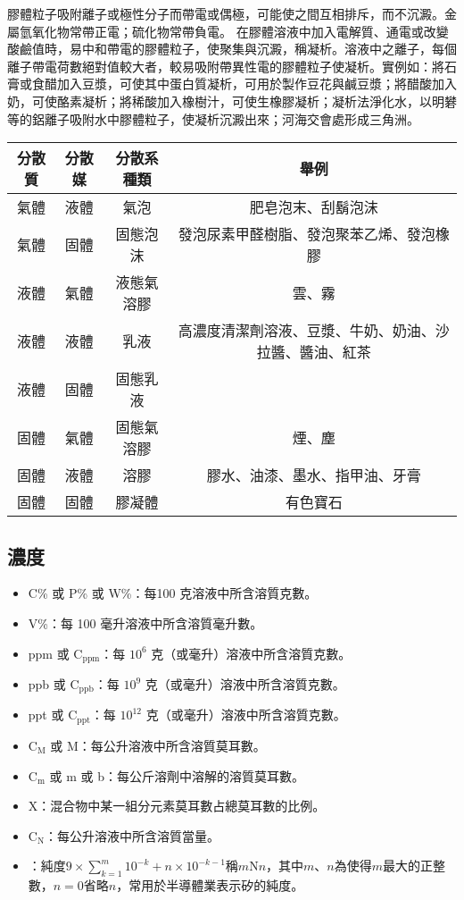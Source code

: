 \documentclass[a4paper,12pt]{article}
\begin{document}
膠體粒子吸附離子或極性分子而帶電或偶極，可能使之間互相排斥，而不沉澱。金屬氫氧化物常帶正電；硫化物常帶負電。
在膠體溶液中加入電解質、通電或改變酸鹼值時，易中和帶電的膠體粒子，使聚集與沉澱，稱凝析。溶液中之離子，每個離子帶電荷數絕對值較大者，較易吸附帶異性電的膠體粒子使凝析。實例如：將石膏或食醋加入豆漿，可使其中蛋白質凝析，可用於製作豆花與鹹豆漿；將醋酸加入奶，可使酪素凝析；將稀酸加入橡樹汁，可使生橡膠凝析；凝析法淨化水，以明礬等的鋁離子吸附水中膠體粒子，使凝析沉澱出來；河海交會處形成三角洲。
\begin{longtable}[c]{|c|c|c|c|}
\hline
分散質 & 分散媒 & 分散系種類 & 舉例 \\\hline\endhead
氣體 & 液體 & 氣泡 & 肥皂泡末、刮鬍泡沫 \\\hline
氣體 & 固體 & 固態泡沫 & 發泡尿素甲醛樹脂、發泡聚苯乙烯、發泡橡膠 \\\hline
液體 & 氣體 & 液態氣溶膠 & 雲、霧 \\\hline
液體 & 液體 & 乳液 & 高濃度清潔劑溶液、豆漿、牛奶、奶油、沙拉醬、醬油、紅茶 \\\hline
液體 & 固體 & 固態乳液 & \\\hline
固體 & 氣體 & 固態氣溶膠 & 煙、塵 \\\hline
固體 & 液體 & 溶膠 & 膠水、油漆、墨水、指甲油、牙膏 \\\hline
固體 & 固體 & 膠凝體 & 有色寶石 \\\hline
\end{longtable}\FB
\subsection{濃度}
\begin{itemize}
    \item {} C\% 或 P\% 或 W\%：每100 克溶液中所含溶質克數。
    \item {} V\%：每 100 毫升溶液中所含溶質毫升數。
    \item {} ppm 或 C$_\text{ppm}$：每 $10^6$ 克（或毫升）溶液中所含溶質克數。
    \item {} ppb 或 C$_\text{ppb}$：每 $10^9$ 克（或毫升）溶液中所含溶質克數。
    \item {} ppt 或 C$_\text{ppt}$：每 $10^{12}$ 克（或毫升）溶液中所含溶質克數。
    \item {} C$_\text{M}$ 或 M：每公升溶液中所含溶質莫耳數。
    \item {} C$_\text{m}$ 或 m 或 b：每公斤溶劑中溶解的溶質莫耳數。
    \item {} X：混合物中某一組分元素莫耳數占總莫耳數的比例。
    \item {} C$_\text{N}$：每公升溶液中所含溶質當量。
    \item{}：純度$9\times\sum_{k=1}^m10^{-k}+n\times10^{-k-1}$稱$m$N$n$，其中$m$、$n$為使得$m$最大的正整數，$n=0$省略$n$，常用於半導體業表示矽的純度。
\end{itemize}
\end{document}
